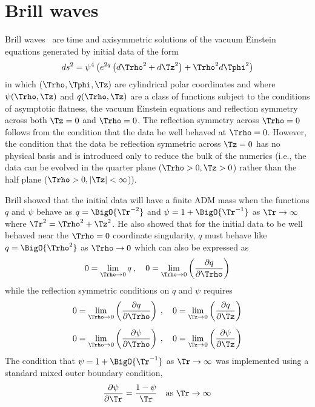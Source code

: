 \documentclass[a4paper,12pt]{article}
\numberwithin{equation}{section}
\begin{document}
\section{Brill waves}
\label{sec:BrillIntro}

Brill waves~\cite{brill:1959-01} are time and axisymmetric solutions of the vacuum Einstein
equations generated by initial data of the form
\begin{align}
   \label{eqn:BrillMetric}
   ds^2 = \psi^4\left(e^{2q}\left(d\Trho^2 + d\Tz^2\right) + \Trho^2 d\Tphi^2\right)
\end{align}
in which $(\Trho,\Tphi,\Tz)$ are cylindrical polar coordinates and where $\psi(\Trho,\Tz)$
and $q(\Trho,\Tz)$ are a class of functions subject to the conditions of asymptotic
flatness, the vacuum Einstein equations and reflection symmetry across both $\Tz=0$ and
$\Trho=0$. The reflection symmetry across $\Trho=0$ follows from the condition that the data
be well behaved at $\Trho=0$. However, the condition that the data be reflection symmetric
across $\Tz=0$ has no physical basis and is introduced only to reduce the bulk of the
numerics (i.e., the data can be evolved in the quarter plane ($\Trho>0,\Tz>0$) rather than
the half plane ($\Trho>0,\vert\Tz\vert<\infty$)).

Brill showed that the initial data will have a finite ADM mass when the functions $q$ and
$\psi$ behave as $q=\BigO{\Tr^{-2}}$ and $\psi=1 + \BigO{\Tr^{-1}}$ as
$\Tr\rightarrow\infty$ where $\Tr^2=\Trho^2+\Tz^2$. He also showed that for the initial data
to be well behaved near the $\Trho=0$ coordinate singularity, $q$ must behave like
$q=\BigO{\Trho^2}$ as $\Trho\rightarrow0$ which can also be expressed as
\begin{align}
   0 = \lim_{\Trho\rightarrow0} q\>, \quad
   0 = \lim_{\Trho\rightarrow0} \left(\frac{\partial q}{\partial\Trho}\right)
\end{align}
while the reflection symmetric conditions on $q$ and $\psi$ requires
\begin{gather}
   \label{eqn:BrillBCa}
    0 = \lim_{\Trho\rightarrow0} \left(\frac{\partial q}{\partial\Trho}\right)\>,\quad
    0 = \lim_{\Tz\rightarrow0}   \left(\frac{\partial q}{\partial\Tz}\right)\\[5pt]
   \label{eqn:BrillBCb}
    0 = \lim_{\Trho\rightarrow0} \left(\frac{\partial\psi}{\partial\Trho}\right)\>,\quad
    0 = \lim_{\Tz\rightarrow0}   \left(\frac{\partial\psi}{\partial\Tz}\right)
\end{gather}
The condition that $\psi=1 + \BigO{\Tr^{-1}}$ as $\Tr\rightarrow\infty$ was implemented
using a standard mixed outer boundary condition,
\begin{align}
   \label{eqn:BrillBCc}
   \frac{\partial\psi}{\partial\Tr}
   =
   \frac{1-\psi}{\Tr}\quad\text{as }\Tr\rightarrow\infty
\end{align}
\end{document}

